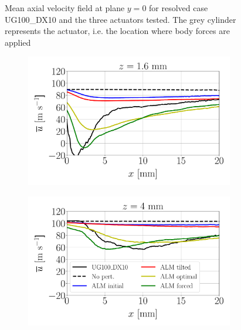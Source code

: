 \clearpage





\begin{figure}[h!]	
	\centering	{}
	\caption{Mean axial velocity field at plane $y = 0$ for resolved case UG100\_DX10 and the three actuators tested. The grey cylinder represents the actuator, i.e. the location where body forces are applied}
	\label{fig:ALM_gas_fields_plane_Y}
\end{figure}




\begin{figure}[ht]
\flushleft
\begin{subfigure}[b]{0.45\textwidth}
	\centering
   \includegraphics[scale=0.25]{./part2_developments/figures_ch6_lagrangian_JICF/gas_field_initial_conditions/ALM_line_y0_along_x_z01p6}
\end{subfigure}
\hspace{0.4in}
\begin{subfigure}[b]{0.45\textwidth}
	\centering
   \includegraphics[scale=0.25]{./part2_developments/figures_ch6_lagrangian_JICF/gas_field_initial_conditions/ALM_line_y0_along_x_z04p0}

\end{subfigure}
\end{figure}
